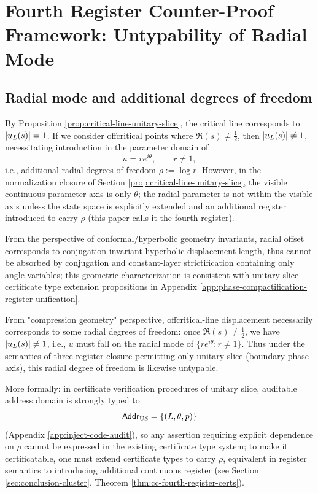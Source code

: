 \section{Fourth Register Counter-Proof Framework: Untypability of Radial Mode}\label{sec:fourth-register}

\subsection{Radial mode and additional degrees of freedom}
By Proposition \ref{prop:critical-line-unitary-slice}, the critical line corresponds to $\left\lvert u_L(s)\right\rvert=1$. If we consider offcritical points where $\Re(s)\neq\tfrac12$, then $\left\lvert u_L(s)\right\rvert\neq 1$, necessitating introduction in the parameter domain of
$$
u=re^{i\theta},\qquad r\neq 1,
$$
i.e., additional radial degrees of freedom $\rho:=\log r$. However, in the normalization closure of Section \ref{prop:critical-line-unitary-slice}, the visible continuous parameter axis is only $\theta$; the radial parameter is not within the visible axis unless the state space is explicitly extended and an additional register introduced to carry $\rho$ (this paper calls it the fourth register).\par

From the perspective of conformal/hyperbolic geometry invariants, radial offset corresponds to conjugation-invariant hyperbolic displacement length, thus cannot be absorbed by conjugation and constant-layer strictification containing only angle variables; this geometric characterization is consistent with unitary slice certificate type extension propositions in Appendix \ref{app:phase-compactification-register-unification}.\par

From "compression geometry" perspective, offcritical-line displacement necessarily corresponds to some radial degrees of freedom: once $\Re(s)\neq\tfrac12$, we have $\left\lvert u_L(s)\right\rvert\neq 1$, i.e., $u$ must fall on the radial mode of $\{re^{i\theta}:r\neq 1\}$. Thus under the semantics of three-register closure permitting only unitary slice (boundary phase axis), this radial degree of freedom is likewise untypable.\par

More formally: in certificate verification procedures of unitary slice, auditable address domain is strongly typed to
$$
\mathsf{Addr}_{\mathrm{US}}=\{(L,\theta,p)\}
$$
(Appendix \ref{app:inject-code-audit}), so any assertion requiring explicit dependence on $\rho$ cannot be expressed in the existing certificate type system; to make it certificatable, one must extend certificate types to carry $\rho$, equivalent in register semantics to introducing additional continuous register (see Section \ref{sec:conclusion-cluster}, Theorem \ref{thm:cc-fourth-register-certs}).\par

